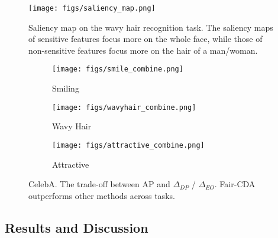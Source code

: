 \documentclass[letterpaper]{article} %
\begin{document}
\begin{figure}[t]
\centering
\texttt{[image: figs/saliency\_map.png]}
\caption{Saliency map on the wavy hair recognition task. The saliency maps of sensitive features focus more on the whole face, while those of non-sensitive features focus more on the hair of a man/woman.}
\label{fig:saliency_map}
\end{figure}



\begin{figure*}[t]
\begin{subfigure}{.32\textwidth}
\centering
\texttt{[image: figs/smile\_combine.png]}
\caption{Smiling}
\label{fig:celeba_smiling}
\end{subfigure}
\begin{subfigure}{.32\textwidth}
\centering		\texttt{[image: figs/wavyhair\_combine.png]}
\caption{Wavy Hair}
\label{fig:celeba_wavy}
\end{subfigure}
\begin{subfigure}{.32\textwidth}
\centering
\texttt{[image: figs/attractive\_combine.png]}
\caption{Attractive}
\label{fig:celeba_attractive}
\end{subfigure}
\caption{{CelebA.} The trade-off between AP and $\Delta_{DP}$ / $\Delta_{EO}$. Fair-CDA outperforms other methods across tasks.}
\label{fig:celeba_dataset}
\end{figure*}



\subsection{Results and Discussion}
\end{document}

